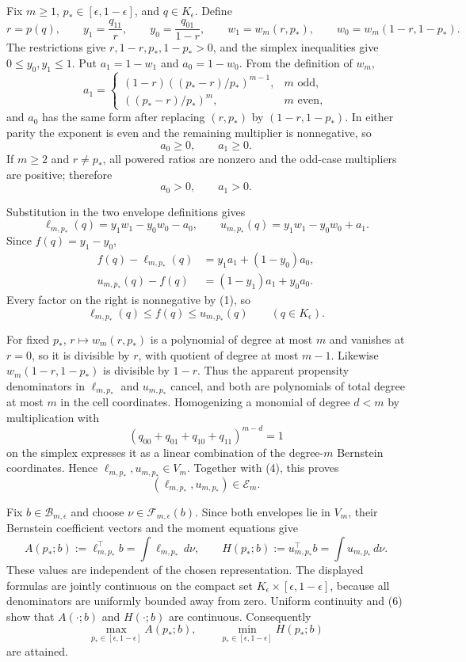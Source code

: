 Fix \(m\geq1\), \(p_*\in[\epsilon,1-\epsilon]\), and \(q\in K_{\epsilon}\).  Define
\[
 r=p(q),\qquad y_1=\frac{q_{11}}r,\qquad y_0=\frac{q_{01}}{1-r},
 \qquad w_1=w_m(r,p_*),\qquad w_0=w_m(1-r,1-p_*).
\]
The restrictions give \(r,1-r,p_*,1-p_*>0\), and the simplex inequalities give \(0\leq y_0,y_1\leq1\).  Put \(a_1=1-w_1\) and \(a_0=1-w_0\).  From the definition of \(w_m\),
\[
 a_1=
 \begin{cases}
 (1-r)((p_*-r)/p_*)^{m-1},&m\text{ odd},\\
 ((p_*-r)/p_*)^m,&m\text{ even},
 \end{cases}
\]
and \(a_0\) has the same form after replacing \((r,p_*)\) by \((1-r,1-p_*)\).  In either parity the exponent is even and the remaining multiplier is nonnegative, so
\[
 a_0\geq0,\qquad a_1\geq0.
\tag{1}
\]
If \(m\geq2\) and \(r\neq p_*\), all powered ratios are nonzero and the odd-case multipliers are positive; therefore
\[
 a_0>0,\qquad a_1>0.
\tag{2}
\]

Substitution in the two envelope definitions gives
\[
 \ell_{m,p_*}(q)=y_1w_1-y_0w_0-a_0,
 \qquad
 u_{m,p_*}(q)=y_1w_1-y_0w_0+a_1.
\]
Since \(f(q)=y_1-y_0\),
\[
 \begin{aligned}
 f(q)-\ell_{m,p_*}(q)&=y_1a_1+(1-y_0)a_0,\\
 u_{m,p_*}(q)-f(q)&=(1-y_1)a_1+y_0a_0.
 \end{aligned}
\tag{3}
\]
Every factor on the right is nonnegative by (1), so
\[
 \ell_{m,p_*}(q)\leq f(q)\leq u_{m,p_*}(q)
 \qquad(q\in K_{\epsilon}).
\tag{4}
\]

For fixed \(p_*\), \(r\mapsto w_m(r,p_*)\) is a polynomial of degree at most \(m\) and vanishes at \(r=0\), so it is divisible by \(r\), with quotient of degree at most \(m-1\).  Likewise \(w_m(1-r,1-p_*)\) is divisible by \(1-r\).  Thus the apparent propensity denominators in \(\ell_{m,p_*}\) and \(u_{m,p_*}\) cancel, and both are polynomials of total degree at most \(m\) in the cell coordinates.  Homogenizing a monomial of degree \(d<m\) by multiplication with
\[
 (q_{00}+q_{01}+q_{10}+q_{11})^{m-d}=1
\]
on the simplex expresses it as a linear combination of the degree-\(m\) Bernstein coordinates.  Hence \(\ell_{m,p_*},u_{m,p_*}\in V_m\).  Together with (4), this proves
\[
 (\ell_{m,p_*},u_{m,p_*})\in\mathcal E_m.
\tag{5}
\]

Fix \(b\in\mathcal B_{m,\epsilon}\) and choose \(\nu\in\mathcal F_{m,\epsilon}(b)\).  Since both envelopes lie in \(V_m\), their Bernstein coefficient vectors and the moment equations give
\[
 A(p_*;b):=\ell_{m,p_*}^{\top}b=\int\ell_{m,p_*}\,d\nu,
 \qquad
 H(p_*;b):=u_{m,p_*}^{\top}b=\int u_{m,p_*}\,d\nu.
\tag{6}
\]
These values are independent of the chosen representation.  The displayed formulas are jointly continuous on the compact set \(K_{\epsilon}\times[\epsilon,1-\epsilon]\), because all denominators are uniformly bounded away from zero.  Uniform continuity and (6) show that \(A(\cdot;b)\) and \(H(\cdot;b)\) are continuous.  Consequently
\[
 \max_{p_*\in[\epsilon,1-\epsilon]}A(p_*;b),
 \qquad
 \min_{p_*\in[\epsilon,1-\epsilon]}H(p_*;b)
\tag{7}
\]
are attained.

